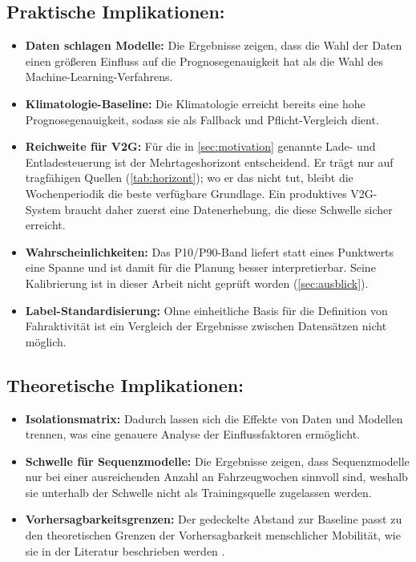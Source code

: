 \subsection*{Praktische Implikationen:}
\begin{itemize}
    \item \textbf{Daten schlagen Modelle:} Die Ergebnisse zeigen, dass die Wahl der Daten einen größeren Einfluss auf die Prognosegenauigkeit hat als die Wahl des Machine-Learning-Verfahrens. 
    \item \textbf{Klimatologie-Baseline:} Die Klimatologie erreicht bereits eine hohe Prognosegenauigkeit, sodass sie als Fallback und Pflicht-Vergleich dient.
    \item \textbf{Reichweite für V2G:} Für die in \cref{sec:motivation} genannte Lade- und Entladesteuerung ist der Mehrtageshorizont entscheidend. Er trägt nur auf tragfähigen Quellen (\cref{tab:horizont}); wo er das nicht tut, bleibt die Wochenperiodik die beste verfügbare Grundlage. Ein produktives V2G-System braucht daher zuerst eine Datenerhebung, die diese Schwelle sicher erreicht.
    \item \textbf{Wahrscheinlichkeiten:} Das P10/P90-Band liefert statt eines Punktwerts eine Spanne und ist damit für die Planung besser interpretierbar. Seine Kalibrierung ist in dieser Arbeit nicht geprüft worden (\cref{sec:ausblick}).
    \item \textbf{Label-Standardisierung:} Ohne einheitliche Basis für die Definition von Fahraktivität ist ein Vergleich der Ergebnisse zwischen Datensätzen nicht möglich.
\end{itemize}

\subsection*{Theoretische Implikationen:}
\begin{itemize}
    \item \textbf{Isolationsmatrix:} Dadurch lassen sich die Effekte von Daten und Modellen trennen, was eine genauere Analyse der Einflussfaktoren ermöglicht.
    \item \textbf{Schwelle für Sequenzmodelle:} Die Ergebnisse zeigen, dass Sequenzmodelle nur bei einer ausreichenden Anzahl an Fahrzeugwochen sinnvoll sind, weshalb sie unterhalb der Schwelle nicht als Trainingsquelle zugelassen werden.
    \item \textbf{Vorhersagbarkeitsgrenzen:} Der gedeckelte Abstand zur Baseline passt zu den theoretischen Grenzen der Vorhersagbarkeit menschlicher Mobilität, wie sie in der Literatur beschrieben werden \parencite{song2010limits}.
\end{itemize}